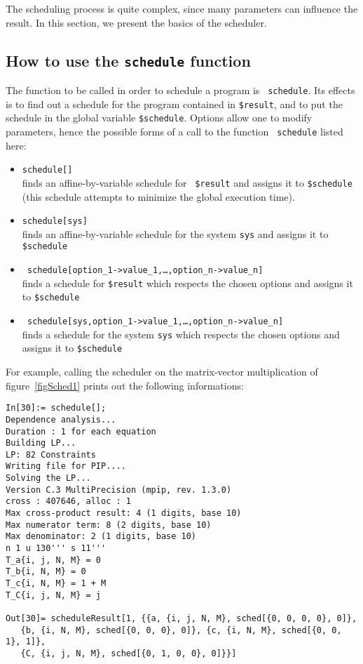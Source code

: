 The scheduling process is quite complex, since many parameters
can influence the result. In this section, 
we present the basics of the scheduler.

\subsection{How to use the \texttt{schedule} function}

The function to be called in order to schedule a program is {\tt
schedule}. Its effects is to find out a schedule for the {\aalpha} program
contained in \texttt{\$result}, and to put the schedule in the
global \mma{} variable \texttt{\$schedule}. Options allow one to modify
parameters, hence the possible forms of a call to the function {\tt
schedule} listed here: 
\begin{itemize}
\item \texttt{schedule[]}\\ finds an affine-by-variable schedule for {\tt
\$result} and assigns it to
\texttt{\$schedule} (this schedule attempts to  minimize
 the global execution time).
\item \texttt{schedule[sys]}\\ 
finds an affine-by-variable schedule for the {\aalpha} system \texttt{sys}
 and assigns it to
\texttt{\$schedule}
\item {\tt
schedule[option\_1->value\_1,\ldots,option\_n->value\_n]}\\
finds a schedule for \texttt{\$result} which respects the chosen options and
assigns it to \texttt{\$schedule}
\item {\tt
schedule[sys,option\_1->value\_1,\ldots,option\_n->value\_n]}\\
finds a schedule for the {\aalpha} system \texttt{sys} which
 respects the chosen options and
assigns it to \texttt{\$schedule}
\end{itemize}

For example, calling the scheduler on the matrix-vector multiplication
of figure~\ref{figSched1} prints out the following informations:
\begin{verbatim}
In[30]:= schedule[];
Dependence analysis...
Duration : 1 for each equation 
Building LP...
LP: 82 Constraints
Writing file for PIP....
Solving the LP...
Version C.3 MultiPrecision (mpip, rev. 1.3.0)
cross : 407646, alloc : 1
Max cross-product result: 4 (1 digits, base 10)
Max numerator term: 8 (2 digits, base 10)
Max denominator: 2 (1 digits, base 10)
n 1 u 130''' s 11'''
T_a{i, j, N, M} = 0
T_b{i, N, M} = 0
T_c{i, N, M} = 1 + M
T_C{i, j, N, M} = j

Out[30]= scheduleResult[1, {{a, {i, j, N, M}, sched[{0, 0, 0, 0}, 0]}, 
   {b, {i, N, M}, sched[{0, 0, 0}, 0]}, {c, {i, N, M}, sched[{0, 0, 1}, 1]}, 
   {C, {i, j, N, M}, sched[{0, 1, 0, 0}, 0]}}]
\end{verbatim}
 
